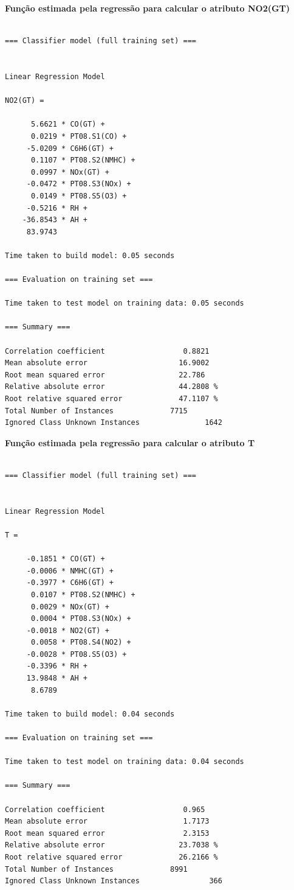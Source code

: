 \newpage

\textbf{Função estimada pela regressão para calcular o atributo NO2(GT)}

\begin{lstlisting}[frame=single]

=== Classifier model (full training set) ===


Linear Regression Model

NO2(GT) =

      5.6621 * CO(GT) +
      0.0219 * PT08.S1(CO) +
     -5.0209 * C6H6(GT) +
      0.1107 * PT08.S2(NMHC) +
      0.0997 * NOx(GT) +
     -0.0472 * PT08.S3(NOx) +
      0.0149 * PT08.S5(O3) +
     -0.5216 * RH +
    -36.8543 * AH +
     83.9743

Time taken to build model: 0.05 seconds

=== Evaluation on training set ===

Time taken to test model on training data: 0.05 seconds

=== Summary ===

Correlation coefficient                  0.8821
Mean absolute error                     16.9002
Root mean squared error                 22.786 
Relative absolute error                 44.2808 %
Root relative squared error             47.1107 %
Total Number of Instances             7715     
Ignored Class Unknown Instances               1642  

\end{lstlisting}


\newpage

\textbf{Função estimada pela regressão para calcular o atributo T}

\begin{lstlisting}[frame=single]

=== Classifier model (full training set) ===


Linear Regression Model

T =

     -0.1851 * CO(GT) +
     -0.0006 * NMHC(GT) +
     -0.3977 * C6H6(GT) +
      0.0107 * PT08.S2(NMHC) +
      0.0029 * NOx(GT) +
      0.0004 * PT08.S3(NOx) +
     -0.0018 * NO2(GT) +
      0.0058 * PT08.S4(NO2) +
     -0.0028 * PT08.S5(O3) +
     -0.3396 * RH +
     13.9848 * AH +
      8.6789

Time taken to build model: 0.04 seconds

=== Evaluation on training set ===

Time taken to test model on training data: 0.04 seconds

=== Summary ===

Correlation coefficient                  0.965 
Mean absolute error                      1.7173
Root mean squared error                  2.3153
Relative absolute error                 23.7038 %
Root relative squared error             26.2166 %
Total Number of Instances             8991     
Ignored Class Unknown Instances                366     

\end{lstlisting}


